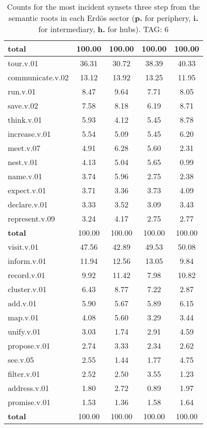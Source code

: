 \begin{table}[h!]
\begin{center}
\begin{tabular}{| l || c | c | c | c |}
{{\bf total}} & 100.00  & 100.00  & 100.00  & 100.00 \\\hline\hline\hline
tour.v.01 & 36.31  & 30.72  & 38.39  & 40.33 \\\hline
communicate.v.02 & 13.12  & 13.92  & 13.25  & 11.95 \\\hline
run.v.01 & 8.47  & 9.64  & 7.71  & 8.05 \\\hline
save.v.02 & 7.58  & 8.18  & 6.19  & 8.71 \\\hline
think.v.01 & 5.93  & 4.12  & 5.45  & 8.78 \\\hline
increase.v.01 & 5.54  & 5.09  & 5.45  & 6.20 \\\hline
meet.v.07 & 4.91  & 6.28  & 5.60  & 2.31 \\\hline
nest.v.01 & 4.13  & 5.04  & 5.65  & 0.99 \\\hline
name.v.01 & 3.74  & 5.96  & 2.75  & 2.38 \\\hline
expect.v.01 & 3.71  & 3.36  & 3.73  & 4.09 \\\hline
declare.v.01 & 3.33  & 3.52  & 3.09  & 3.43 \\\hline
represent.v.09 & 3.24  & 4.17  & 2.75  & 2.77 \\\hline\hline
{{\bf total}} & 100.00  & 100.00  & 100.00  & 100.00 \\\hline\hline\hline
visit.v.01 & 47.56  & 42.89  & 49.53  & 50.08 \\\hline
inform.v.01 & 11.94  & 12.56  & 13.05  & 9.84 \\\hline
record.v.01 & 9.92  & 11.42  & 7.98  & 10.82 \\\hline
cluster.v.01 & 6.43  & 8.77  & 7.22  & 2.87 \\\hline
add.v.01 & 5.90  & 5.67  & 5.89  & 6.15 \\\hline
map.v.01 & 4.08  & 5.60  & 3.29  & 3.44 \\\hline
unify.v.01 & 3.03  & 1.74  & 2.91  & 4.59 \\\hline
propose.v.01 & 2.74  & 3.33  & 2.34  & 2.62 \\\hline
see.v.05 & 2.55  & 1.44  & 1.77  & 4.75 \\\hline
filter.v.01 & 2.52  & 2.50  & 3.55  & 1.23 \\\hline
address.v.01 & 1.80  & 2.72  & 0.89  & 1.97 \\\hline
promise.v.01 & 1.53  & 1.36  & 1.58  & 1.64 \\\hline\hline
{{\bf total}} & 100.00  & 100.00  & 100.00  & 100.00 \\\hline
\end{tabular}
\caption{Counts for the most incident synsets three step from the semantic roots in each Erd\"os sector ({\bf p.} for periphery, {\bf i.} for intermediary, {\bf h.} for hubs). TAG: 6}
\end{center}
\end{table}